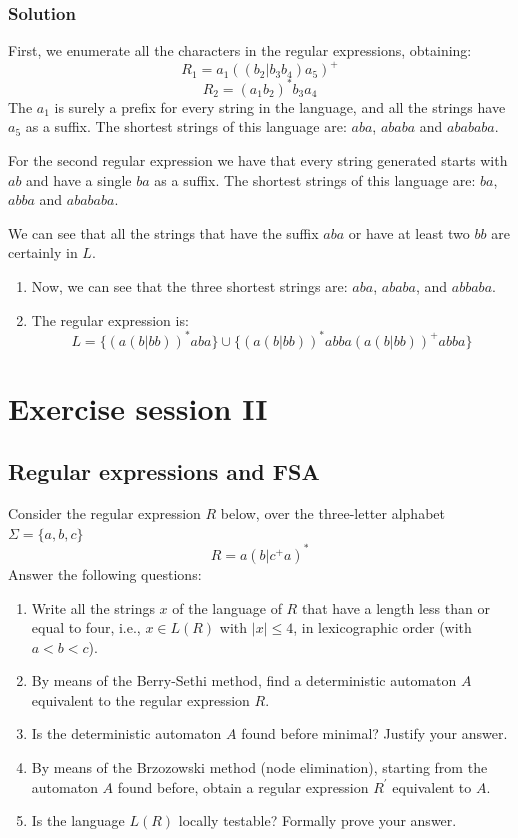 \documentclass[12pt, a4paper]{report}
\newtheorem[style=M,bodystyle=\normalfont]{theorem}{Theorem}
\newtheorem[style=M,bodystyle=\normalfont]{corollary}{Corollary}
\newtheorem[style=M,bodystyle=\normalfont]{lemma}{Lemma}
\newtheorem[style=M,bodystyle=\normalfont]{definition}{Definition}
\begin{document}
    \subsection*{Solution}
        First, we enumerate all the characters in the regular expressions, obtaining: 
        \[R_1=a_1((b_2|b_3b_4)a_5)^{+}\]
        \[R_2=(a_1b_2)^{*}b_3a_4\]
        The $a_1$ is surely a prefix for every string in the language, and all the strings have $a_5$ as a suffix. The shortest strings of this language are: $aba$, $ababa$ and $abababa$. 
        
        For the second regular expression we have that every string generated starts with $ab$ and have a single $ba$ as a suffix. The shortest strings of this language are: $ba$, $abba$ and $abababa$. 
        
        We can see that all the strings that have the suffix $aba$ or have at least two $bb$ are certainly in $L$. 

        \begin{enumerate}
            \item Now, we can see that the three shortest strings are: $aba$, $ababa$, and $abbaba$. 
            \item The regular expression is: 
                \[L=\{(a(b|bb))^{*}aba\} \cup \{(a(b|bb))^{*}abba(a(b|bb))^{+}abba\}\]
        \end{enumerate}    
    
\newpage

\chapter{Exercise session II}
    \section{Regular expressions and FSA}
        Consider the regular expression $R$ below, over the three-letter alphabet $\Sigma=\{a,b,c\}$ 
        \[R=a\left( b|c^{+}a \right)^{*}\]
        Answer the following questions:
        \begin{enumerate}
            \item Write all the strings $x$ of the language of $R$ that have a length less than or equal to four, i.e., $x \in L(R)$ with $|x| \leq 4$, in lexicographic order 
                (with $a < b < c$).
            \item By means of the Berry-Sethi method, find a deterministic automaton $A$ equivalent to the regular expression $R$. 
            \item Is the deterministic automaton $A$ found before minimal? Justify your answer.
            \item By means of the Brzozowski method (node elimination), starting from the automaton $A$ found before, obtain a regular expression $R^{'}$ equivalent to $A$.
            \item Is the language $L(R)$ locally testable? Formally prove your answer.
        \end{enumerate}
\end{document}
